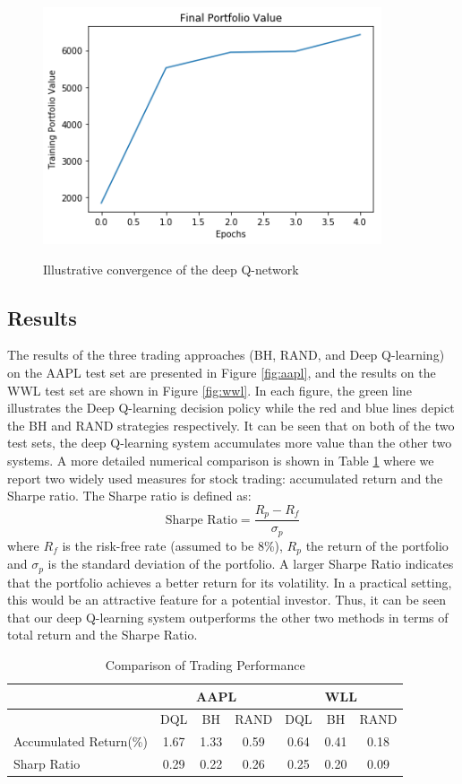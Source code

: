 \documentclass[12pt, authoryear]{elsarticle}
\begin{document}
\begin{figure}[H]
	\centering
	\caption{Illustrative convergence of the deep Q-network}
	\includegraphics[clip, angle=0, width=10cm]{figures/training.png}
	\label{fig:conver}
\end{figure}

\subsection{Results}

The results of the three trading approaches (BH, RAND, and Deep Q-learning) on the AAPL test set are presented in Figure \ref{fig:aapl}, and the results on the WWL test set are shown in Figure \ref{fig:wwl}. In each figure, the green line illustrates the Deep Q-learning decision policy while the red and blue lines depict the BH and RAND strategies respectively. It can be seen that on both of the two test sets, the deep Q-learning system accumulates more value than the other two systems. A more detailed numerical comparison is shown in Table \ref{table-1} where we report two widely used measures for stock trading: accumulated return and the Sharpe ratio. The Sharpe ratio is defined as:
$$
\text {Sharpe Ratio} = \frac { R _ { p } - R _ { f } } { \sigma _ { p } }
$$
where $R_{f}$ is the risk-free rate (assumed to be 8\%), $R_{p}$ the return of the portfolio and $\sigma_{p}$ is the standard deviation of the portfolio. A larger Sharpe Ratio indicates that the portfolio achieves a better return for its volatility. In a practical setting, this would be an attractive feature for a potential investor. Thus, it can be seen that our deep Q-learning system outperforms the other two methods in terms of total return and the Sharpe Ratio.

\begin{table}[h!]
	\centering
	\caption{Comparison of Trading Performance}
	\label{table-1}
	\begin{tabular}{lcccccc} \\ \hline\hline
		& \multicolumn{3}{c}{AAPL} & \multicolumn{3}{c}{WLL} \\ \hline
		& DQL & BH & RAND & DQL & BH & RAND \\ \hline
		Accumulated Return(\%) & 1.67 & 1.33 & 0.59 & 0.64 & 0.41 & 0.18 \\
		Sharp Ratio & 0.29 & 0.22 & 0.26 & 0.25 & 0.20 & 0.09 \\\hline\hline
	\end{tabular}
\end{table}
\end{document}
